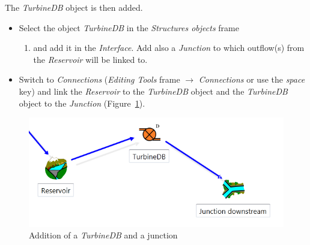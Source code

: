 \documentclass[
  letterpaper,
  DIV=11,
  numbers=noendperiod]{scrreprt}
\providecommand{\tightlist}{%
  \setlength{\itemsep}{0pt}\setlength{\parskip}{0pt}}\usepackage{longtable,booktabs,array}
\begin{document}
The \emph{TurbineDB} object is then added.

\begin{itemize}
\tightlist
\item
  Select the object \emph{TurbineDB} in the \emph{Structures objects}
  frame

  \begin{enumerate}
  \def\labelenumi{(\arabic{enumi})}
  \tightlist
  \item
    and add it in the \emph{Interface}. Add also a \emph{Junction} to
    which outflow(s) from the \emph{Reservoir} will be linked to.
  \end{enumerate}
\item
  {Switch to \emph{Connections} (\emph{Editing Tools} frame
  \(\rightarrow\) \emph{Connections} or use the \emph{space} key) and
  link the \emph{Reservoir} to the \emph{TurbineDB} object and the
  \emph{TurbineDB} object to the \emph{Junction}
  (Figure~\ref{fig-addition_turbinedb_junction}).}
\end{itemize}

\begin{figure}

{\centering \includegraphics{./figures/fig-addition_turbinedb_junction.png}

}

\caption{\label{fig-addition_turbinedb_junction}Addition of a
\emph{TurbineDB} and a junction}

\end{figure}
\end{document}

